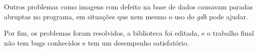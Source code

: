\documentclass[10pt,a4paper,draft]{article}
\begin{document}
Outros problemas como imagens com defeito na base de dados causavam paradas abruptas no programa, em situações que nem mesmo o uso do \textit{gdb} pode ajudar.

Por fim, os problemas foram resolvidos, a biblioteca foi editada, e o trabalho final não tem bugs conhecidos e tem um desempenho satisfatório.
\end{document}
